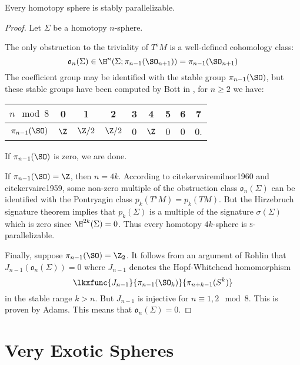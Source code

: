 \begin{theorem}\label{thm:homotopy-sphere-stably-parallelizable}
	Every homotopy sphere is stably parallelizable.
\end{theorem}
\begin{proof}
	Let $\Sigma$ be a homotopy $n$-sphere.

	The only obstruction to the triviality of $T^sM$ is a well-defined cohomology class:
	\[
		\mathfrak{o}_n(\Sigma) \in \H^n(\Sigma; \pi_{n-1}(\SO_{n+1})) = \pi_{n-1}(\SO_{n+1})
	\]
	The coefficient group may be identified with the stable group $\pi_{n-1}(\SO)$, but these stable groups have been computed by Bott in \cite{bott1959stable}, for $n\geq 2$ we have:
	\begin{center}
		\begin{tabular}{c|cccccccc}
			\textrm{$n\mod 8$} & 0    & 1      & 2      & 3 & 4    & 5 & 6 & 7  \\
			\hline
			$\pi_{n-1}(\SO)$   & $\Z$ & $\Z/2$ & $\Z/2$ & 0 & $\Z$ & 0 & 0 & 0.
		\end{tabular}
	\end{center}
	If $\pi_{n-1}(\SO)$ is zero, we are done.

	If $\pi_{n-1}(\SO) = \Z$, then $n=4k$. According to cite{kervairemilnor1960} and cite{kervaire1959}, some non-zero multiple of the obstruction class $\mathfrak{o}_n(\Sigma)$ can be identified with the Pontryagin class $p_k(T^s M) = p_k(TM)$.  But the Hirzebruch signature theorem implies  that $p_k(\Sigma)$ is a multiple of the signature $\sigma(\Sigma)$ which is zero since $\H^{2k}(\Sigma)=0$. Thus every homotopy $4k$-sphere is \textsc{s}-parallelizable.

	Finally, suppose $\pi_{n-1}(\SO)= \Z_2$. It follows from an argument of Rohlin  that $J_{n-1}(\mathfrak{o}_n(\Sigma))=0$ where $J_{n-1}$ denotes the Hopf-Whitehead homomorphism
	\[
		\lkxfunc{J_{n-1}}{\pi_{n-1}(\SO_k)}{\pi_{n+k-1}(S^k)}
	\]
	in the stable range $k >n$. But $J_{n-1}$ is injective for $n\equiv 1, 2\mod 8$. This is proven by Adams.  This means that $\mathfrak{o}_n(\Sigma)=0$.
\end{proof}

\section{Very Exotic Spheres}

